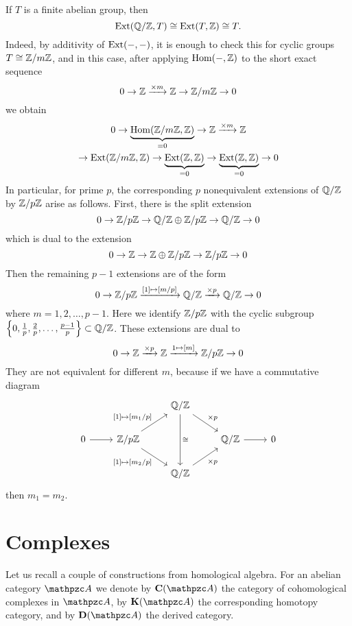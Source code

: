 \begin{example}
  \label{example:Ext-QZ-T}
  If $T$ is a finite abelian group, then
  $$\operatorname{Ext} (\mathbb{Q}/\mathbb{Z},T) \cong \operatorname{Ext} (T,\mathbb{Z}) \cong T.$$
  Indeed, by additivity of $\operatorname{Ext} (-,-)$, it is enough to check this for cyclic
  groups $T \cong \mathbb{Z}/m\mathbb{Z}$, and in this case, after applying $\operatorname{Hom} (-,\mathbb{Z})$ to
  the short exact sequence
  $$0 \to \mathbb{Z} \xrightarrow{\times m} \mathbb{Z} \to \mathbb{Z}/m\mathbb{Z} \to 0$$
  we obtain
  \begin{multline*}
    0 \to \underbrace{\operatorname{Hom} (\mathbb{Z}/m\mathbb{Z},\mathbb{Z})}_{=0} \to
    \mathbb{Z} \xrightarrow{\times m} \mathbb{Z} \\
    \to \operatorname{Ext} (\mathbb{Z}/m\mathbb{Z},\mathbb{Z}) \to
    \underbrace{\operatorname{Ext} (\mathbb{Z},\mathbb{Z})}_{= 0} \to
    \underbrace{\operatorname{Ext} (\mathbb{Z},\mathbb{Z})}_{= 0} \to 0
  \end{multline*}
  In particular, for prime $p$, the corresponding $p$ nonequivalent extensions
  of $\mathbb{Q}/\mathbb{Z}$ by $\mathbb{Z}/p\mathbb{Z}$ arise as follows. First, there is the split
  extension
  $$0 \to \mathbb{Z}/p\mathbb{Z} \to \mathbb{Q}/\mathbb{Z}\oplus \mathbb{Z}/p\mathbb{Z} \to \mathbb{Q}/\mathbb{Z} \to 0$$
  which is dual to the extension
  $$0 \to \mathbb{Z} \to \mathbb{Z}\oplus \mathbb{Z}/p\mathbb{Z} \to \mathbb{Z}/p\mathbb{Z} \to 0$$
  Then the remaining $p-1$ extensions are of the form
  \[ 0 \to \mathbb{Z}/p\mathbb{Z} \xrightarrow{[1] \mapsto [m/p]}
    \mathbb{Q}/\mathbb{Z} \xrightarrow{\times p} \mathbb{Q}/\mathbb{Z} \to 0 \]
  where $m = 1,2,\ldots,p-1$. Here we identify $\mathbb{Z}/p\mathbb{Z}$ with the cyclic
  subgroup
  $\left\{ 0, \frac{1}{p}, \frac{2}{p}, \ldots, \frac{p-1}{p} \right\} \subset \mathbb{Q}/\mathbb{Z}$.
  These extensions are dual to
  $$0 \to \mathbb{Z} \xrightarrow{\times p} \mathbb{Z} \xrightarrow{1 \mapsto [m]} \mathbb{Z}/p\mathbb{Z} \to 0$$
  They are not equivalent for different $m$, because if we have a commutative
  diagram
  \[ \begin{tikzcd}
      & & \QQ/\ZZ\ar{dr}{\times p}\ar{dd}{\isom} \\
      0 \ar{r} & \ZZ/p\ZZ\ar{ur}{[1] \mapsto [m_1/p]}\ar{dr}[swap]{[1] \mapsto [m_2/p]} & & \QQ/\ZZ \ar{r} & 0\\
      & & \QQ/\ZZ\ar{ur}[swap]{\times p}
    \end{tikzcd} \]
  then $m_1 = m_2$.
\end{example}


\section{Complexes}
\label{section:complexes}

Let us recall a couple of constructions from homological algebra. For an abelian
category $\vcateg{A}$ we denote by $\categ{C} (\vcateg{A})$ the category of
cohomological complexes in $\vcateg{A}$, by $\categ{K} (\vcateg{A})$ the
corresponding homotopy category, and by $\categ{D} (\vcateg{A})$ the derived
category.

